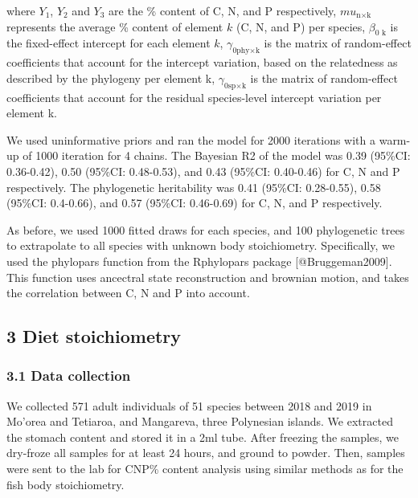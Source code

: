 \documentclass[12pt,a4paper]{article}
\begin{document}
\noindent where \(Y_1\), \(Y_2\) and \(Y_3\) are the \% content of
\(\textrm{C}\), \(\textrm{N}\), and \(\textrm{P}\) respectively,
\(mu_{\textrm{n}\times\textrm{k}}\) represents the average \% content of
element \(k\) (\(\textrm{C}\), \(\textrm{N}\), and \(\textrm{P}\)) per
species, \(\beta_\textrm{0 k}\) is the fixed-effect intercept for each
element \(k\), \(\gamma_{\textrm{0phy}\times\textrm{k}}\) is the matrix
of random-effect coefficients that account for the intercept variation,
based on the relatedness as described by the phylogeny per element k,
\(\gamma_{\textrm{0sp}\times\textrm{k}}\) is the matrix of random-effect
coefficients that account for the residual species-level intercept
variation per element k.

\noindent We used uninformative priors and ran the model for 2000
iterations with a warm-up of 1000 iteration for 4 chains. \noindent The
Bayesian R2 of the model was 0.39 (95\%CI: 0.36-0.42), 0.50 (95\%CI:
0.48-0.53), and 0.43 (95\%CI: 0.40-0.46) for C, N and P respectively.
\noindent The phylogenetic heritability was 0.41 (95\%CI: 0.28-0.55),
0.58 (95\%CI: 0.4-0.66), and 0.57 (95\%CI: 0.46-0.69) for C, N, and P
respectively.

\noindent As before, we used 1000 fitted draws for each species, and 100
phylogenetic trees to extrapolate to all species with unknown body
stoichiometry. Specifically, we used the phylopars function from the
Rphylopars package {[}@Bruggeman2009{]}. This function uses ancectral
state reconstruction and brownian motion, and takes the correlation
between C, N and P into account.

\hypertarget{diet-stoichiometry}{%
\subsection{3 Diet stoichiometry}\label{diet-stoichiometry}}

\hypertarget{data-collection-1}{%
\subsubsection{3.1 Data collection}\label{data-collection-1}}

\noindent We collected 571 adult individuals of 51 species between 2018
and 2019 in Mo'orea and Tetiaroa, and Mangareva, three Polynesian
islands. We extracted the stomach content and stored it in a 2ml tube.
After freezing the samples, we dry-froze all samples for at least 24
hours, and ground to powder. Then, samples were sent to the lab for
CNP\% content analysis using similar methods as for the fish body
stoichiometry.
\end{document}
